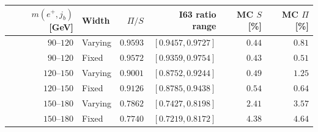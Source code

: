 \begin{tabular}{rlrrrr}
\toprule
$m(e^+,j_b)$ [GeV] & Width & $\Pi/S$ & I63 ratio range & MC $S$ [\%] & MC $\Pi$ [\%] \\
\midrule
$90$--$120$ & Varying & $0.9593$ & $[0.9457,0.9727]$ & $0.44$ & $0.81$ \\
$90$--$120$ & Fixed & $0.9572$ & $[0.9359,0.9754]$ & $0.43$ & $0.51$ \\
$120$--$150$ & Varying & $0.9001$ & $[0.8752,0.9244]$ & $0.49$ & $1.25$ \\
$120$--$150$ & Fixed & $0.9126$ & $[0.8785,0.9438]$ & $0.54$ & $0.64$ \\
$150$--$180$ & Varying & $0.7862$ & $[0.7427,0.8198]$ & $2.41$ & $3.57$ \\
$150$--$180$ & Fixed & $0.7740$ & $[0.7219,0.8172]$ & $4.38$ & $4.64$ \\
\bottomrule
\end{tabular}
